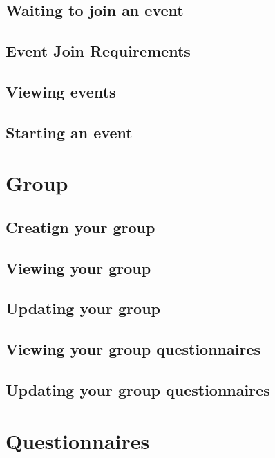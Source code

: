 \documentclass[a4paper,11pt,titlepage]{scrartcl}
\begin{document}
\subsection{Waiting to join an event}

\subsection{Event Join Requirements}

\subsection{Viewing events}

\subsection{Starting an event}

\clearpage
\section{Group}

\subsection{Creatign your group}

\subsection{Viewing your group}

\subsection{Updating your group}

\subsection{Viewing your group questionnaires}

\subsection{Updating your group questionnaires}

\clearpage
\section{Questionnaires}
\end{document}
